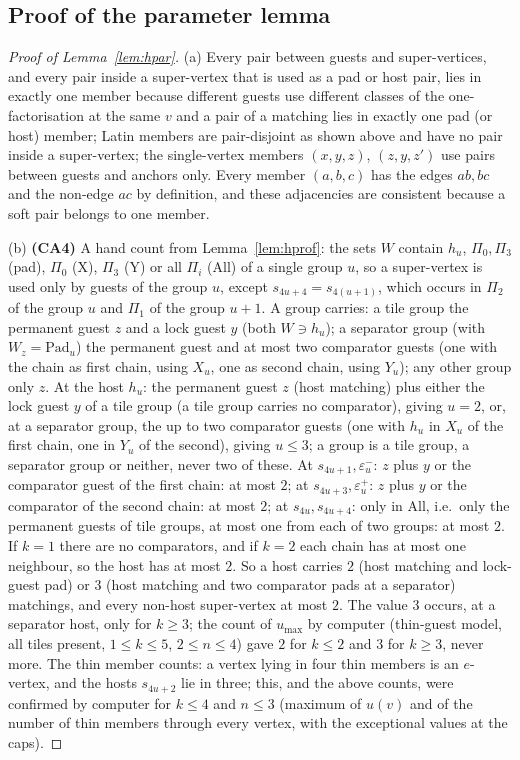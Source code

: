 \subsection{Proof of the parameter lemma}
\begin{proof}[Proof of Lemma~\ref{lem:hpar}]
(a) Every pair between guests and super-vertices, and every pair inside a super-vertex that is used as a pad or host pair, lies in exactly one member because different guests use different classes of the one-factorisation at the same $v$ and a pair of a matching lies in exactly one pad (or host) member; Latin members are pair-disjoint as shown above and have no pair inside a super-vertex; the single-vertex members $(x,y,z)$, $(z,y,z')$ use pairs between guests and anchors only. Every member $(a,b,c)$ has the edges $ab,bc$ and the non-edge $ac$ by definition, and these adjacencies are consistent because a soft pair belongs to one member.

(b) \textbf{(CA4)} A hand count from Lemma~\ref{lem:hprof}: the sets $W$ contain $h_u$, $\Pi_0,\Pi_3$ (pad), $\Pi_0$ (X), $\Pi_3$ (Y) or all $\Pi_i$ (All) of a single group $u$, so a super-vertex is used only by guests of the group $u$, except $s_{4u+4}=s_{4(u+1)}$, which occurs in $\Pi_2$ of the group $u$ and $\Pi_1$ of the group $u+1$. A group carries: a tile group the permanent guest $z$ and a lock guest $y$ (both $W\ni h_u$); a separator group (with $W_z=\mathrm{Pad}_u$) the permanent guest and at most two comparator guests (one with the chain as first chain, using $X_u$, one as second chain, using $Y_u$); any other group only $z$. At the host $h_u$: the permanent guest $z$ (host matching) plus either the lock guest $y$ of a tile group (a tile group carries no comparator), giving $u=2$, or, at a separator group, the up to two comparator guests (one with $h_u$ in $X_u$ of the first chain, one in $Y_u$ of the second), giving $u\le3$; a group is a tile group, a separator group or neither, never two of these. At $s_{4u+1},\varepsilon^-_u$: $z$ plus $y$ or the comparator guest of the first chain: at most $2$; at $s_{4u+3},\varepsilon^+_u$: $z$ plus $y$ or the comparator of the second chain: at most $2$; at $s_{4u},s_{4u+4}$: only in $\mathrm{All}$, i.e.\ only the permanent guests of tile groups, at most one from each of two groups: at most $2$. If $k=1$ there are no comparators, and if $k=2$ each chain has at most one neighbour, so the host has at most $2$. So a host carries $2$ (host matching and lock-guest pad) or $3$ (host matching and two comparator pads at a separator) matchings, and every non-host super-vertex at most $2$. The value $3$ occurs, at a separator host, only for $k\ge3$; the count of $u_{\max}$ by computer (thin-guest model, all tiles present, $1\le k\le5$, $2\le n\le4$) gave $2$ for $k\le2$ and $3$ for $k\ge3$, never more. The thin member counts: a vertex lying in four thin members is an $e$-vertex, and the hosts $s_{4u+2}$ lie in three; this, and the above counts, were confirmed by computer for $k\le4$ and $n\le3$ (maximum of $u(v)$ and of the number of thin members through every vertex, with the exceptional values at the caps).


\end{proof}
